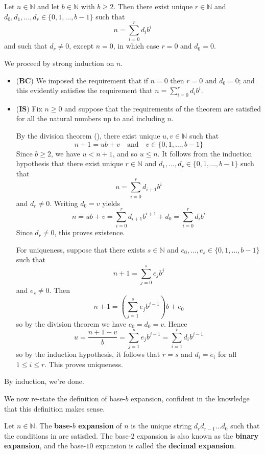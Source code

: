 \begin{theorem}
\label{thmBaseBExpansion}
Let $n \in \mathbb{N}$ and let $b \in \mathbb{N}$ with $b \ge 2$. Then there exist unique $r \in \mathbb{N}$ and $d_0, d_1, \dots, d_r \in \{ 0, 1, \dots, b-1 \}$ such that
\[ n = \sum_{i=0}^r d_i b^i \]
and such that $d_r \ne 0$, except $n=0$, in which case $r=0$ and $d_0=0$.
\end{theorem}
\begin{cproof}
We proceed by strong induction on $n$.
\begin{itemize}
\item (\textbf{BC}) We imposed the requirement that if $n=0$ then $r=0$ and $d_0=0$; and this evidently satisfies the requirement that $n=\sum_{i=0}^r d_ib^i$.
\item (\textbf{IS}) Fix $n \ge 0$ and suppose that the requirements of the theorem are satisfied for all the natural numbers up to and including $n$.

By the division theorem (), there exist unique $u,v \in \mathbb{N}$ such that
\[ n+1=ub+v \quad \text{and} \quad v \in \{ 0,1,\dots,b-1 \} \]
Since $b \ge 2$, we have $u < n+1$, and so $u \le n$. It follows from the induction hypothesis that there exist unique $r \in \mathbb{N}$ and $d_1,\dots,d_r \in \{ 0,1,\dots,b-1 \}$ such that
\[ u=\sum_{i=0}^r d_{i+1}b^i \]
and $d_r \ne 0$. Writing $d_0=v$ yields
\[ n = ub+v = \sum_{i=0}^r d_{i+1}b^{i+1} + d_0 = \sum_{i=0}^r d_ib^i \]
Since $d_r \ne 0$, this proves existence.

For uniqueness, suppose that there exists $s \in \mathbb{N}$ and $e_0,\dots,e_s \in \{ 0,1,\dots,b-1\}$ such that
\[ n+1 = \sum_{j=0}^s e_jb^j \]
and $e_s \ne 0$. Then
\[ n+1 = \left( \sum_{j=1}^s e_jb^{j-1} \right) b + e_0 \]
so by the division theorem we have $e_0=d_0=v$. Hence
\[ u = \frac{n+1-v}{b} = \sum_{j=1}^s e_jb^{j-1} = \sum_{i=1}^r d_ib^{j-1} \]
so by the induction hypothesis, it follows that $r=s$ and $d_i=e_i$ for all $1 \le i \le r$. This proves uniqueness.
\end{itemize}
By induction, we're done.
\end{cproof}

We now re-state the definition of base-$b$ expansion, confident in the knowledge that this definition makes sense.

\begin{definition}
\label{defBaseBExpansion}
Let $n \in \mathbb{N}$. The \textbf{base-$b$ expansion} of $n$ is the unique string $d_r d_{r-1} \dots d_0$ such that the conditions in  are satisfied. The base-$2$ expansion is also known as the \textbf{binary expansion}, and the base-$10$ expansion is called the \textbf{decimal expansion}.
\end{definition}


